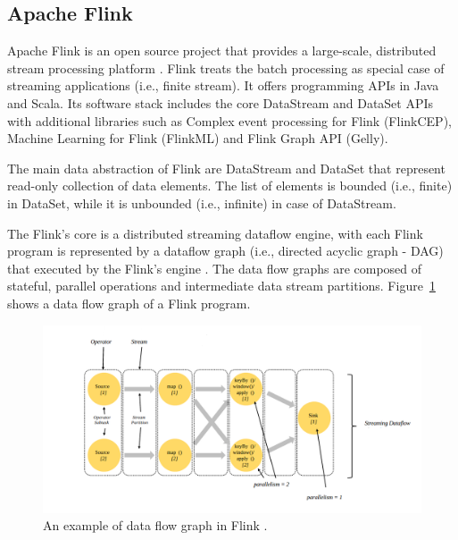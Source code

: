\documentclass[]{article}
\begin{document}
\subsection{Apache Flink}

\par Apache Flink is an open source project that provides a large-scale, distributed stream processing platform \cite{flink}. Flink treats the batch processing as special case of streaming applications (i.e., finite stream).
It offers programming APIs in Java and Scala. Its software stack includes the core DataStream and DataSet APIs with additional libraries such as Complex event processing for Flink (FlinkCEP), Machine Learning for Flink (FlinkML)  and Flink Graph API (Gelly).

\par The main data abstraction of Flink are DataStream and DataSet that represent read-only collection of data elements. The list of elements is bounded (i.e., finite) in DataSet, while it is unbounded (i.e., infinite) in case of DataStream.

\par The Flink's core is a distributed streaming dataflow engine,  with each Flink program is represented by a dataflow graph (i.e., directed acyclic graph - DAG) that executed by the Flink's engine \cite{flink_paper}. The data flow graphs are composed of stateful, parallel operations and intermediate data stream partitions. Figure~\ref{fig:fstream} shows a data flow graph of a Flink program.


\begin{figure}[h]

  \centering
    \includegraphics[width=\textwidth, height=.5\textheight]{flink_engine.png}
     \caption{ An example of data flow graph in Flink \cite{flink}.}
      \label{fig:fstream}
\end{figure} 
\newpage
\end{document}
